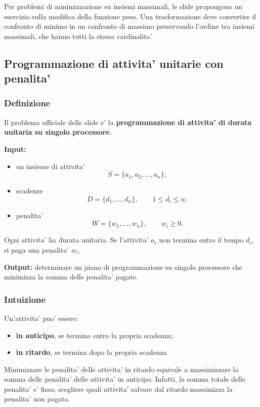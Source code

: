 Per problemi di minimizzazione su insiemi massimali, le slide propongono un esercizio sulla modifica della funzione peso. Una trasformazione deve convertire il confronto di minimo in un confronto di massimo preservando l'ordine tra insiemi massimali, che hanno tutti la stessa cardinalita'.

\subsection{Programmazione di attivita' unitarie con penalita'}

\subsubsection{Definizione}
Il problema ufficiale delle slide e' la \textbf{programmazione di attivita' di durata unitaria su singolo processore}.

\textbf{Input:}
\begin{itemize}
	\item un insieme di attivita'
	\[
	S=\{a_1,a_2,\ldots,a_n\};
	\]
	\item scadenze
	\[
	D=\{d_1,\ldots,d_n\},\qquad 1\le d_i\le n;
	\]
	\item penalita'
	\[
	W=\{w_1,\ldots,w_n\},\qquad w_i\ge 0.
	\]
\end{itemize}

Ogni attivita' ha durata unitaria. Se l'attivita' $a_i$ non termina entro il tempo $d_i$, si paga una penalita' $w_i$.

\textbf{Output:} determinare un piano di programmazione su singolo processore che minimizza la somma delle penalita' pagate.

\subsubsection{Intuizione}
Un'attivita' puo' essere:
\begin{itemize}
	\item \textbf{in anticipo}, se termina entro la propria scadenza;
	\item \textbf{in ritardo}, se termina dopo la propria scadenza.
\end{itemize}

Minimizzare le penalita' delle attivita' in ritardo equivale a massimizzare la somma delle penalita' delle attivita' in anticipo. Infatti, la somma totale delle penalita' e' fissa; scegliere quali attivita' salvare dal ritardo massimizza la penalita' non pagata.

